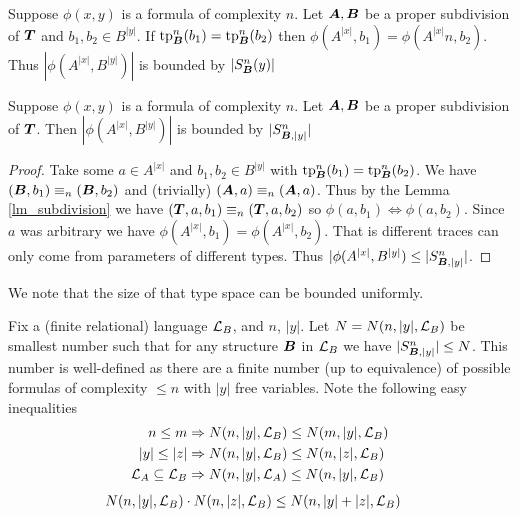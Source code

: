 \documentclass{amsart}
\DeclareMathOperator{\TT}{\boldface T}
\DeclareMathOperator{\A}{\boldface A}
\DeclareMathOperator{\B}{\boldface B}
\begin{document}
\begin{Corollary} \label{cor_type_count}
	Suppose $\phi(x,y)$ is a formula of complexity $n$. Let $\A, \B$ be a proper subdivision of $\TT$ and $b_1, b_2 \in B^{|y|}$. If $\tp^n_{\B}(b_1) = \tp^n_{\B}(b_2)$ then $\phi(A^{|x|}, b_1) = \phi(A^{|x|} n, b_2)$. Thus $|\phi(A^{|x|}, B^{|y|})|$ is bounded by $|S^n_{\B}(y)|$
\end{Corollary}

\begin{Corollary} \label{cor_type_count}
	Suppose $\phi(x,y)$ is a formula of complexity $n$. Let $\A, \B$ be a proper subdivision of $\TT$. Then $|\phi(A^{|x|}, B^{|y|})|$ is bounded by $|S^n_{\B, |y|}|$
\end{Corollary}

\begin{proof}
	Take some $a \in A^{|x|}$ and $b_1, b_2 \in B^{|y|}$ with $\tp^n_{\B}(b_1) = \tp^n_{\B}(b_2)$. We have $(\B, b_1) \equiv_n (\B, b_2)$ and (trivially) $(\A, a) \equiv_n (\A, a)$. Thus by the Lemma \ref{lm_subdivision} we have $(\TT, a, b_1) \equiv_n (\TT, a, b_2)$ so $\phi(a, b_1) \iff \phi(a, b_2)$. Since $a$ was arbitrary we have $\phi(A^{|x|}, b_1) = \phi(A^{|x|}, b_2)$. That is different traces can only come from parameters of different types. Thus $|\phi(A^{|x|}, B^{|y|}) \leq |S^n_{\B, |y|}|$.
\end{proof}

We note that the size of that type space can be bounded uniformly.

\begin{Definition} \label{def_type_count}
	Fix a (finite relational) language $\mathcal L_B$, and $n$, $|y|$. Let $N = N(n, |y|, \mathcal L_B)$ be smallest number such that for any structure $\B$ in $\mathcal L_B$ we have $|S^n_{\B, |y|}| \leq N$. This number is well-defined as there are a finite number (up to equivalence) of possible formulas of complexity $\leq n$ with $|y|$ free variables. Note the following easy inequalities
	\begin{align*}
		n \leq m &\Rightarrow N(n, |y|, \mathcal L_B) \leq N(m, |y|, \mathcal L_B) \\
		|y| \leq |z| &\Rightarrow N(n, |y|, \mathcal L_B) \leq N(n, |z|, \mathcal L_B) \\
		\mathcal L_A \subseteq \mathcal L_B &\Rightarrow N(n, |y|, \mathcal L_A) \leq N(n, |y|, \mathcal L_B)
	\end{align*}
	\begin{align*}
		N(n, |y|, \mathcal L_B) \cdot N(n, |z|, \mathcal L_B) &\leq N(n, |y|+|z|, \mathcal L_B) 
	\end{align*}
\end{Definition}
\end{document}

